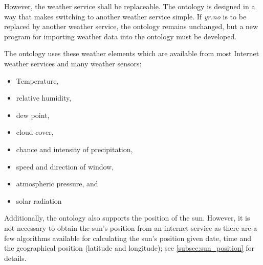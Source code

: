 However, the weather service shall be replaceable. The ontology is designed in a way that makes switching to another weather service simple. If \emph{yr.no} is to be replaced by another weather service, the ontology remains unchanged, but a new program for importing weather data into the ontology must be developed.

The ontology uses these weather elements which are available from most Internet weather services and many weather sensors:
\begin{itemize}
  \item Temperature,
  \item relative humidity,
  \item dew point,
  \item cloud cover,
  \item chance and intensity of precipitation,
  \item speed and direction of window,
  \item atmospheric pressure, and
  \item solar radiation
\end{itemize}

Additionally, the ontology also supports the position of the sun. However, it is not necessary to obtain the sun's position from an internet service as there are a few algorithms available for calculating the sun's position given date, time and the geographical position (latitude and longitude); see \ref{subsec:sun_position} for details.

